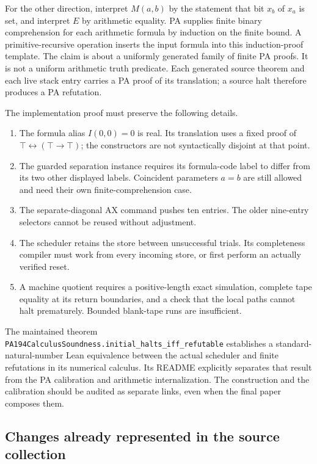 For the other direction, interpret $M(a,b)$ by the statement that bit $x_b$
of $x_a$ is set, and interpret $E$ by arithmetic equality. PA supplies finite
binary comprehension for each arithmetic formula by induction on the
finite bound. A primitive-recursive operation inserts the input formula
into this induction-proof template. The claim is about a uniformly
generated family of finite PA proofs. It is not a uniform arithmetic truth
predicate. Each generated source theorem and each live stack entry carries
a PA proof of its translation; a source halt therefore produces a PA
refutation.

The implementation proof must preserve the following details.
\begin{enumerate}
\item The formula alias $I(0,0)=0$ is real. Its translation uses a fixed
      proof of $\top\leftrightarrow(\top\to\top)$; the constructors are
      not syntactically disjoint at that point.
\item The guarded separation instance requires its formula-code label to
      differ from its two other displayed labels. Coincident parameters
      $a=b$ are still allowed and need their own finite-comprehension case.
\item The separate-diagonal AX command pushes ten entries. The older
      nine-entry selectors cannot be reused without adjustment.
\item The scheduler retains the store between unsuccessful trials. Its
      completeness compiler must work from every incoming store, or first
      perform an actually verified reset.
\item A machine quotient requires a positive-length exact simulation,
      complete tape equality at its return boundaries, and a check that
      the local paths cannot halt prematurely. Bounded blank-tape runs are
      insufficient.
\end{enumerate}

The maintained theorem
\texttt{PA194CalculusSoundness.initial\_halts\_iff\_refutable}
establishes a standard-natural-number Lean equivalence between the actual
scheduler and finite refutations in its numerical calculus. Its README
explicitly separates that result from the PA calibration and arithmetic
internalization. The construction and the calibration should be audited
as separate links, even when the final paper composes them.

\subsection{Changes already represented in the source collection}

